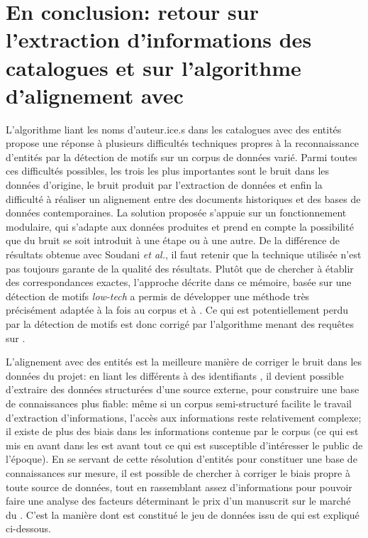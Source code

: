 \section{En conclusion: retour sur l'extraction d'informations des catalogues et sur l'algorithme d'alignement avec \wkd{}}
L'algorithme liant les noms d'auteur.ice.s dans les catalogues avec des entités \wkd{} propose une réponse à plusieurs difficultés techniques propres à la reconnaissance d'entités par la détection de motifs sur un corpus de données varié. Parmi toutes ces difficultés possibles, les trois les plus importantes sont le bruit dans les données d'origine, le bruit produit par l'extraction de données et enfin la difficulté à réaliser un alignement entre des documents historiques et des bases de données contemporaines. La solution proposée s'appuie sur un fonctionnement modulaire, qui s'adapte aux données produites et prend en compte la possibilité que du bruit se soit introduit à une étape ou à une autre. De la différence de résultats obtenue avec Soudani \textit{et al.}, il faut retenir que la technique utilisée n'est pas toujours garante de la qualité des résultats. Plutôt que de chercher à établir des correspondances exactes, l'approche décrite dans ce mémoire, basée sur une détection de motifs \textit{low-tech} a permis de développer une méthode très précisément adaptée à la fois au corpus et à \wkd{}. Ce qui est potentiellement perdu par la détection de motifs est donc corrigé par l'algorithme menant des requêtes sur \wkd{}. 

L'alignement avec des entités \wkd{} est la meilleure manière de corriger le bruit dans les données du projet: en liant les différents \tname{} à des identifiants \wkd{}, il devient possible d'extraire des données structurées d'une source externe, pour construire une base de connaissances plus fiable: même si un corpus semi-structuré facilite le travail d'extraction d'informations, l'accès aux informations reste relativement complexe; il existe de plus des biais dans les informations contenue par le corpus (ce qui est mis en avant dans les \ttrait{} est avant tout ce qui est susceptible d'intéresser le public de l'époque). En se servant de cette résolution d'entités pour constituer une base de connaissances sur mesure, il est possible de chercher à corriger le biais propre à toute source de données, tout en rassemblant assez d'informations pour pouvoir faire une analyse des facteurs déterminant le prix d'un manuscrit sur le marché du . C'est la manière dont est constitué le jeu de données issu de \wkd{} qui est expliqué ci-dessous.


